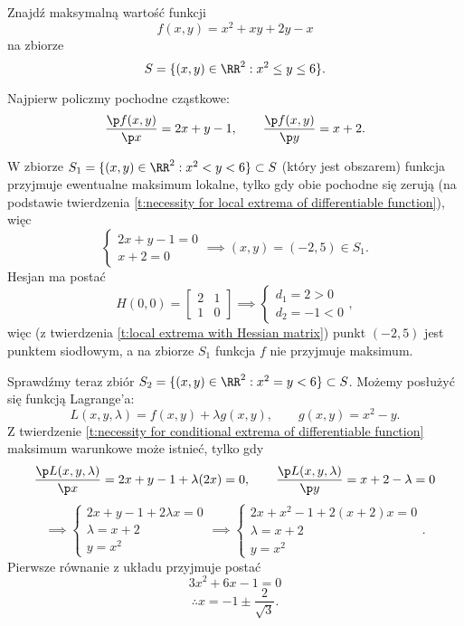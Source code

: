 \begin{example}
    Znajdź maksymalną wartość funkcji
    \[ f(x, y) = x^2 + xy + 2y - x \]
    na zbiorze
    \[ S = \{(x, y) \in \RR^2 : x^2 \leq y \leq 6\}. \]
\end{example}

\begin{solution}
    Najpierw policzmy pochodne cząstkowe:
    \[ \frac{\p f(x, y)}{\p x} = 2x + y - 1, \qquad \frac{\p f(x, y)}{\p y} = x + 2. \]

    W zbiorze $S_1 = \{(x, y) \in \RR^2 : x^2 < y < 6\} \subset S$ (który jest obszarem) funkcja przyjmuje ewentualne maksimum lokalne, tylko gdy obie pochodne się zerują (na podstawie twierdzenia \ref{t:necessity for local extrema of differentiable function}), więc
    \[ \begin{cases} 2x + y - 1 = 0 \\ x + 2 = 0 \end{cases} \implies (x, y) = (-2, 5) \in S_1. \]
    Hesjan ma postać
    \[ H(0, 0) = \begin{bmatrix}
        2 & 1 \\
        1 & 0
    \end{bmatrix} \implies \begin{cases} d_1 = 2 > 0 \\ d_2 = -1 < 0 \end{cases}, \]
    więc (z twierdzenia \ref{t:local extrema with Hessian matrix}) punkt $(-2, 5)$ jest punktem siodłowym, a na zbiorze $S_1$ funkcja $f$ nie przyjmuje maksimum.

    Sprawdźmy teraz zbiór $S_2 = \{(x, y) \in \RR^2 : x^2 = y < 6\} \subset S$. Możemy posłużyć się funkcją Lagrange'a:
    \[ L(x, y, \lambda) = f(x, y) + \lambda g(x, y), \qquad g(x, y) = x^2 - y. \]
    Z twierdzenie \ref{t:necessity for conditional extrema of differentiable function} maksimum warunkowe może istnieć, tylko gdy
    \[ \frac{\p L(x, y, \lambda)}{\p x} = 2x + y - 1 + \lambda(2x) = 0, \qquad \frac{\p L(x, y, \lambda)}{\p y} = x + 2 - \lambda = 0 \]
    \[ \implies \begin{cases} 2x + y - 1 + 2\lambda x = 0 \\ \lambda = x + 2 \\ y = x^2 \end{cases} \implies \begin{cases} 2x + x^2 - 1 + 2(x+2)x = 0 \\ \lambda = x + 2 \\ y = x^2 \end{cases}. \]
    Pierwsze równanie z układu przyjmuje postać
    \begin{equation}
        \label{eq:quadratic in example}
        3x^2 + 6x - 1 = 0
    \end{equation}
    \[ \therefore x = -1 \pm \frac{2}{\sqrt{3}}. \]


\end{solution}
